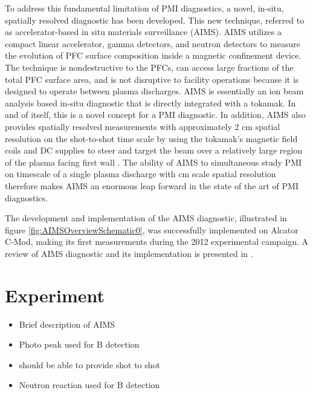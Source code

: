 \documentclass[11pt,a4paper,twocolumn]{article}
\begin{document}

To address this fundamental limitation of PMI diagnostics, a novel, in-situ, spatially resolved diagnostic has been developed.  This new technique, referred to as accelerator-based in situ materials surveillance (AIMS). AIMS utilizes a compact linear accelerator, gamma detectors, and neutron detectors to measure the evolution of PFC surface composition inside a magnetic confinement device. The technique is nondestructive to the PFCs, can access large fractions of the total PFC surface area, and is not disruptive to facility operations because it is designed to operate between plasma discharges.   AIMS is essentially an ion beam analysis based in-situ diagnostic that is directly integrated with a tokamak.  In and of itself, this is a novel concept for a PMI diagnostic.  In addition, AIMS also provides spatially resolved measurements with approximately 2 cm spatial resolution on the shot-to-shot time scale by using the tokamak's magnetic field coils and DC supplies to steer and target the beam over a relatively large region of the plasma facing first wall \cite{RSIPaper}.  The ability of AIMS to simultaneous study PMI on timescale of a single plasma discharge with cm scale spatial resolution therefore makes AIMS an enormous leap forward in the state of the art of PMI diagnostics.  

The development and implementation of the AIMS diagnostic, illustrated in figure \ref{fig:AIMSOverviewSchematic0}, was successfully implemented on Alcator C-Mod, making its first measurements during the 2012 experimental campaign.  A review of AIMS diagnostic and its implementation is presented in \cite{RSIPaper}.  

\section{Experiment}
\begin{itemize}
	\item Brief description of AIMS
	\item Photo peak used for B detection
	\item should be able to provide shot to shot 
	\item Neutron reaction used for B detection
\end{itemize}
\end{document}
